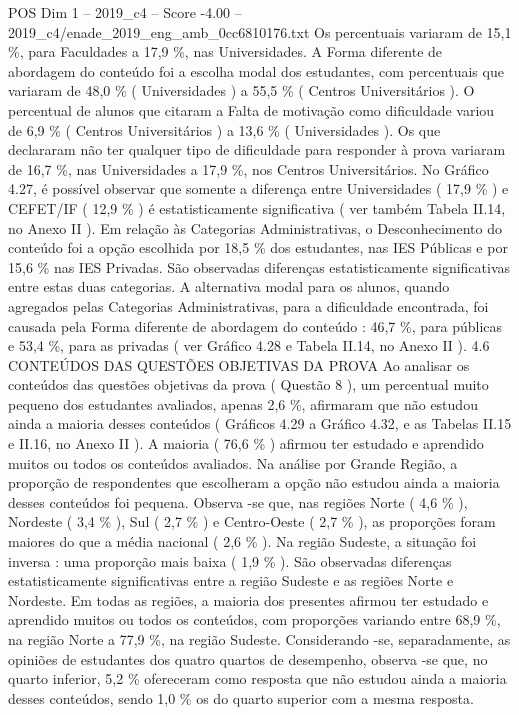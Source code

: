\begin{textsample}{POS Dim 1 – 2019\_c4 – Score -4.00 – 2019\_c4/enade\_2019\_eng\_amb\_0cc6810176.txt}
Os percentuais variaram de 15,1 \%, para Faculdades a 17,9 \%, nas Universidades.
A Forma diferente de abordagem do conteúdo foi a escolha modal dos estudantes, com percentuais que variaram de 48,0 \% ( Universidades ) a 55,5 \% ( Centros Universitários ).
O percentual de alunos que citaram a Falta de motivação como dificuldade variou de 6,9 \% ( Centros Universitários ) a 13,6 \% ( Universidades ).
Os que declararam não ter qualquer tipo de dificuldade para responder à prova variaram de 16,7 \%, nas Universidades a 17,9 \%, nos Centros Universitários.
No Gráfico 4.27, é possível observar que somente a diferença entre Universidades ( 17,9 \% ) e CEFET/IF ( 12,9 \% ) é estatisticamente significativa ( ver também Tabela II.14, no Anexo II ).
Em relação às Categorias Administrativas, o Desconhecimento do conteúdo foi a opção escolhida por 18,5 \% dos estudantes, nas IES Públicas e por 15,6 \% nas IES Privadas.
São observadas diferenças estatisticamente significativas entre estas duas categorias.
A alternativa modal para os alunos, quando agregados pelas Categorias Administrativas, para a dificuldade encontrada, foi causada pela Forma diferente de abordagem do conteúdo : 46,7 \%, para públicas e 53,4 \%, para as privadas ( ver Gráfico 4.28 e Tabela II.14, no Anexo II ). 4.6 CONTEÚDOS DAS QUESTÕES OBJETIVAS DA PROVA Ao analisar os conteúdos das questões objetivas da prova ( Questão 8 ), um percentual muito pequeno dos estudantes avaliados, apenas 2,6 \%, afirmaram que não estudou ainda a maioria desses conteúdos ( Gráficos 4.29 a Gráfico 4.32, e as Tabelas II.15 e II.16, no Anexo II ).
A maioria ( 76,6 \% ) afirmou ter estudado e aprendido muitos ou todos os conteúdos avaliados.
Na análise por Grande Região, a proporção de respondentes que escolheram a opção não estudou ainda a maioria desses conteúdos foi pequena.
Observa -se que, nas regiões Norte ( 4,6 \% ), Nordeste ( 3,4 \% ), Sul ( 2,7 \% ) e Centro-Oeste ( 2,7 \% ), as proporções foram maiores do que a média nacional ( 2,6 \% ).
Na região Sudeste, a situação foi inversa : uma proporção mais baixa ( 1,9 \% ).
São observadas diferenças estatisticamente significativas entre a região Sudeste e as regiões Norte e Nordeste.
Em todas as regiões, a maioria dos presentes afirmou ter estudado e aprendido muitos ou todos os conteúdos, com proporções variando entre 68,9 \%, na região Norte a 77,9 \%, na região Sudeste.
Considerando -se, separadamente, as opiniões de estudantes dos quatro quartos de desempenho, observa -se que, no quarto inferior, 5,2 \% ofereceram como resposta que não estudou ainda a maioria desses conteúdos, sendo 1,0 \% os do quarto superior com a mesma resposta.

\end{textsample}
